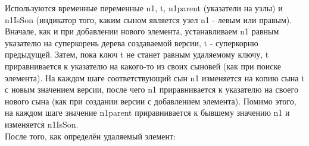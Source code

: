 \documentclass[zuev-23631-2-report.tex]{subfiles}
\begin{document}
Используются временные переменные n1, t, n1parent (указатели на узлы) и n1IsSon (индикатор того, каким сыном является узел n1 - левым или правым).\\
Вначале, как и при добавлении нового элемента, устанавливаем n1 равным указателю на суперкорень дерева создаваемой версии, t - суперкорню предыдущей. Затем, пока ключ t не станет равным удаляемому ключу, t приравнивается к указателю на какого-то из своих сыновей (как при поиске элемента). На каждом шаге соответствующий сын n1 изменяется на копию сына t с новым значением версии, после чего n1 приравнивается к указателю на своего нового сына (как при создании версии с добавлением элемента). Помимо этого, на каждом шаге значение n1parent приравнивается к бывшему значению n1 и изменяется n1IsSon.\\
После того, как определён удаляемый элемент:
\end{document}
